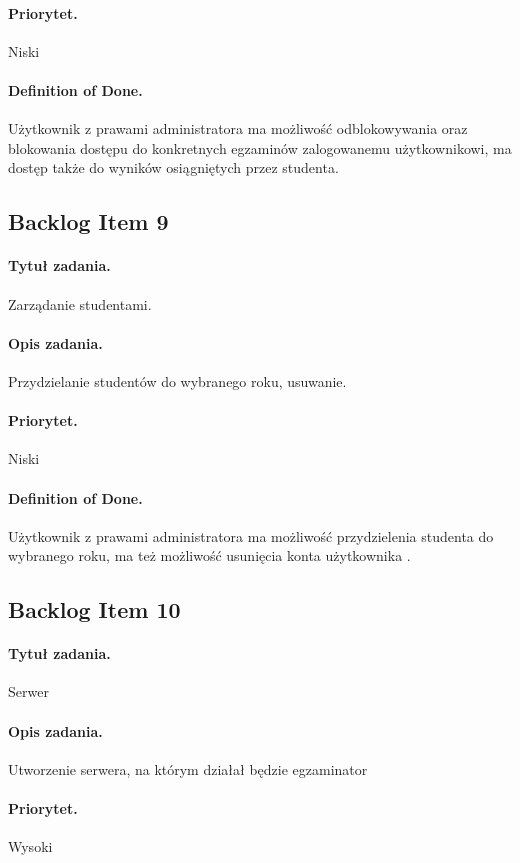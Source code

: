 \documentclass[a4paper]{article}
\begin{document}
\paragraph{Priorytet.} Niski
\paragraph{Definition of Done.} Użytkownik z prawami administratora ma możliwość odblokowywania oraz blokowania dostępu do konkretnych egzaminów zalogowanemu użytkownikowi, ma dostęp także do wyników osiągniętych przez studenta.

\subsection{Backlog Item 9}
\paragraph{Tytuł zadania.} Zarządanie studentami.
\paragraph{Opis zadania.} Przydzielanie studentów do wybranego roku, usuwanie.
\paragraph{Priorytet.} Niski
\paragraph{Definition of Done.} Użytkownik z prawami administratora ma możliwość przydzielenia studenta do wybranego roku, ma też możliwość usunięcia konta użytkownika .

\subsection{Backlog Item 10}
\paragraph{Tytuł zadania.} Serwer
\paragraph{Opis zadania.} Utworzenie serwera, na którym działał będzie egzaminator
\paragraph{Priorytet.} Wysoki
\end{document}
